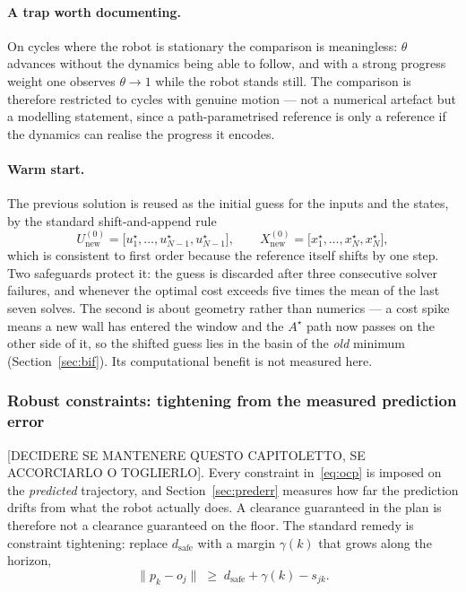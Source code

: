 \documentclass[11pt,a4paper]{article}
\newcommand{\astar}{$A^\star$}
\newcommand{\dsafe}{d_{\mathrm{safe}}}
\begin{document}
\paragraph{A trap worth documenting.} On cycles where the robot is stationary the comparison is
meaningless: $\theta$ advances without the dynamics being able to follow, and with a strong progress weight
one observes $\theta\to1$ while the robot stands still. The comparison is therefore restricted to cycles
with genuine motion --- not a numerical artefact but a modelling statement, since a path-parametrised
reference is only a reference if the dynamics can realise the progress it encodes.

\paragraph{Warm start.} The previous solution is reused as the initial guess for the inputs and the
states, by the standard shift-and-append rule
\begin{equation}
  U^{(0)}_{\text{new}} = \big[u^\star_1,\dots,u^\star_{N-1},u^\star_{N-1}\big],\qquad
  X^{(0)}_{\text{new}} = \big[x^\star_1,\dots,x^\star_{N},x^\star_{N}\big],
  \label{eq:warm}
\end{equation}
which is consistent to first order because the reference itself shifts by one step. Two safeguards protect
it: the guess is discarded after three consecutive solver failures, and whenever the optimal cost exceeds
five times the mean of the last seven solves. The second is about geometry rather than numerics --- a cost
spike means a new wall has entered the window and the \astar{} path now passes on the other side of it, so
the shifted guess lies in the basin of the \emph{old} minimum (Section~\ref{sec:bif}). Its computational
benefit is not measured here.

\subsubsection{Robust constraints: tightening from the measured prediction error}
\label{sec:robust}

[DECIDERE SE MANTENERE QUESTO CAPITOLETTO, SE ACCORCIARLO O TOGLIERLO].
Every constraint in~\eqref{eq:ocp} is imposed on the \emph{predicted} trajectory, and
Section~\ref{sec:prederr} measures how far the prediction drifts from what the robot actually does. A
clearance guaranteed in the plan is therefore not a clearance guaranteed on the floor. The standard remedy is
constraint tightening: replace $\dsafe$ with a margin $\gamma(k)$ that grows along the horizon,
\begin{equation}
  \big\|p_k-o_j\big\| \;\ge\; \dsafe+\gamma(k)-s_{jk}.
  \label{eq:tighten}
\end{equation}
\end{document}
